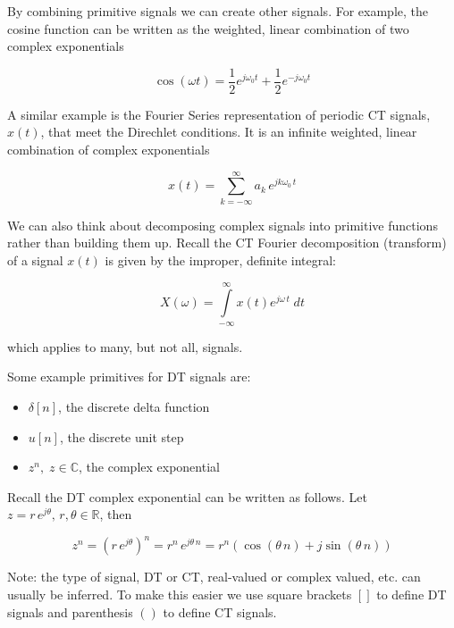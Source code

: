 \documentclass{article}
\begin{document}
By combining primitive signals we can create other signals. For example, the cosine function can be written as the weighted, linear combination of two complex exponentials

\begin{equation}
  \cos(\omega t) = \frac{1}{2} e^{j\omega_0 t} + \frac{1}{2} e^{-j\omega_0 t}
\end{equation}

A similar example is the Fourier Series representation of periodic CT signals, $x(t)$, that meet the Direchlet conditions. It is an infinite weighted, linear combination of complex exponentials

\begin{equation}
  x(t) = \sum\limits_{k = -\infty}^{\infty} a_k\, e^{jk\omega_0\, t}
\end{equation}

We can also think about decomposing complex signals into primitive functions rather than building them up. Recall the CT Fourier decomposition (transform) of a signal $x(t)$ is given by the improper, definite integral:

\begin{equation}
  X(\omega) = \int\limits_{-\infty}^{\infty} x(t) e^{j\omega\, t}\; dt
\end{equation}

which applies to many, but not all, signals.

Some example primitives for DT signals are:

\begin{itemize}
\item $\delta[n]$, the discrete delta function
\item $u[n]$, the discrete unit step
\item $z^n,\; z\in\mathbb{C}$, the complex exponential
\end{itemize}

Recall the DT complex exponential can be written as follows. Let $z = r\, e^{j\theta}, \, r,\theta\in\mathbb{R}$, then

\begin{equation}
  z^n = \left( r\, e^{j\theta} \right)^n = r^n\, e^{j\theta\, n} = r^n\left(\cos(\theta\, n) + j\sin(\theta\, n) \right)
\end{equation}

Note: the type of signal, DT or CT, real-valued or complex valued, etc. can usually be inferred. To make this easier we use square brackets $[]$ to define DT signals and parenthesis $()$ to define CT signals.
\end{document}

